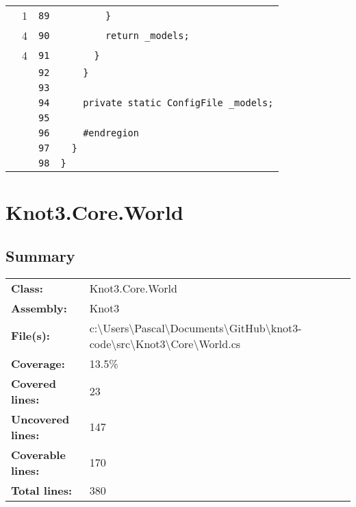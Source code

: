 \documentclass[a4paper,10pt]{article}
\begin{document}
\begin{longtable}[l]{lrrl}
\cellcolor{green} & 1 & \verb~89~ & \verb~        }~\\
\cellcolor{green} & 4 & \verb~90~ & \verb~        return _models;~\\
\cellcolor{green} & 4 & \verb~91~ & \verb~      }~\\
\cellcolor{gray} &  & \verb~92~ & \verb~    }~\\
\cellcolor{gray} &  & \verb~93~ & \verb~~\\
\cellcolor{gray} &  & \verb~94~ & \verb~    private static ConfigFile _models;~\\
\cellcolor{gray} &  & \verb~95~ & \verb~~\\
\cellcolor{gray} &  & \verb~96~ & \verb~    #endregion~\\
\cellcolor{gray} &  & \verb~97~ & \verb~  }~\\
\cellcolor{gray} &  & \verb~98~ & \verb~}~\\
\end{longtable}
\newpage
\section{Knot3.Core.World}
\subsection{Summary}
\begin{longtable}[l]{ll}
\textbf{Class:} & Knot3.Core.World\\
\textbf{Assembly:} & Knot3\\
\textbf{File(s):} & \begin{minipage}[t]{12cm}{c:\textbackslash Users\textbackslash Pascal\textbackslash Documents\textbackslash GitHub\textbackslash knot3-code\textbackslash src\textbackslash Knot3\textbackslash Core\textbackslash World.cs}\end{minipage} \\
\textbf{Coverage:} & 13.5\%\\
\textbf{Covered lines:} & 23\\
\textbf{Uncovered lines:} & 147\\
\textbf{Coverable lines:} & 170\\
\textbf{Total lines:} & 380\\
\end{longtable}
\end{document}
